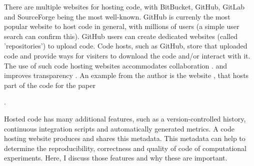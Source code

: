 
There are multiple websites for hosting code, with BitBucket, GitHub,
GitLab and SourceForge being the most well-known.
GitHub is currenly the most popular website to host code in general,
with millions of users (a simple user search can confirm this).
GitHub users can create dedicated websites (called 'repositories')
to upload code. Code hosts, such as GitHub, 
store that uploaded code and provide ways 
for visiters to download the code and/or interact with it.
The use of such code hosting websites
accommodates collaboration \cite{perez2016ten}.
and improves transparency \cite{gorgolewski2016practical}.
An example from the author is the website \cite{bbbqarticleissue157},
that hosts part of the code for the paper \cite{bilderbeek2022transmembrane}

.

Hosted code has many additional features, such as
a version-controlled history, continuous integration scripts
and automatically generated metrics.
A code hosting website produces and shares this metadata.
This metadata can help to determine the
reproducibility, correctness and quality of code
of computational experiments.
Here, I discuss those features and why these are important.

